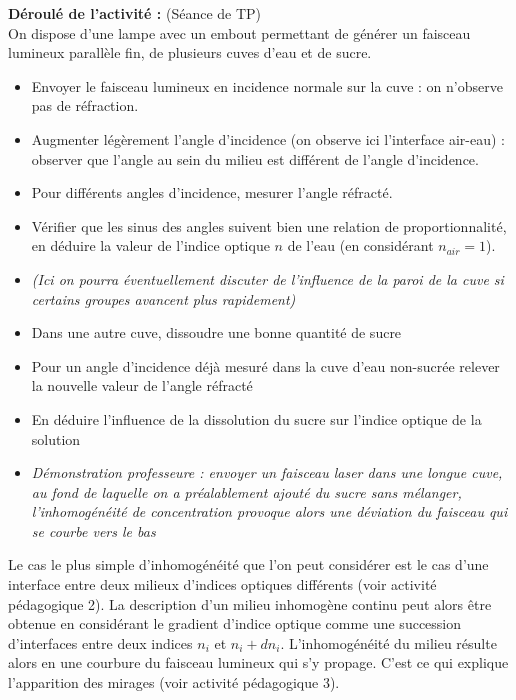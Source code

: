 \documentclass[a4paper,11pt]{article} %
\newcommand{\pointmedian}{{\fontfamily{cmr}\selectfont\textperiodcentered}}
\newenvironment{encart}[1]{%
	\begin{tcolorbox}
		[
		breakable, enhanced jigsaw, %
		arc = 1mm, %
		title = \textbf{#1}, %
		coltitle = white, %
		colbacktitle = blue, %
		colback = white, %
		colframe = blue %
		]
}{		
	\end{tcolorbox}
	\vspace*{0.35cm}
}
\begin{document}
\begin{encart}{Activité pédagogique 2 : Phénomène de réfraction -- Loi de Snell--Descartes}
		\textbf{Déroulé de l'activité :} (Séance de TP)\\
		On dispose d'une lampe avec un embout permettant de générer un faisceau lumineux parallèle fin, de plusieurs cuves d'eau et de sucre.
		\begin{itemize}
			\item Envoyer le faisceau lumineux en incidence normale sur la cuve : on n'observe pas de réfraction.
			\item Augmenter légèrement l'angle d'incidence (on observe ici l'interface air-eau) : observer que l'angle au sein du milieu est différent de l'angle d'incidence.
			\item Pour différents angles d'incidence, mesurer l'angle réfracté.
			\item Vérifier que les sinus des angles suivent bien une relation de proportionnalité, en déduire la valeur de l'indice optique $ n $ de l'eau (en considérant $ n_{air} = 1 $).
			\item \textit{(Ici on pourra éventuellement discuter de l'influence de la paroi de la cuve si certains groupes avancent plus rapidement)}
			\item Dans une autre cuve, dissoudre une bonne quantité de sucre
			\item Pour un angle d'incidence déjà mesuré dans la cuve d'eau non-sucrée relever la nouvelle valeur de l'angle réfracté
			\item En déduire l'influence de la dissolution du sucre sur l'indice optique de la solution
			\item \textit{Démonstration professeur\pointmedian e : envoyer un faisceau laser dans une longue cuve, au fond de laquelle on a préalablement ajouté du sucre sans mélanger, l'inhomogénéité de concentration provoque alors une déviation du faisceau qui se courbe vers le bas} 
		\end{itemize}
		
	\end{encart}
	

	Le cas le plus simple d'inhomogénéité que l'on peut considérer est le cas d'une interface entre deux milieux d'indices optiques différents (voir activité pédagogique 2). La description d'un milieu inhomogène continu peut alors être obtenue en considérant le gradient d'indice optique comme une succession d'interfaces entre deux indices $ n_i $ et $ n_i + dn_i $. L'inhomogénéité du milieu résulte alors en une courbure du faisceau lumineux qui s'y propage. C'est ce qui explique l'apparition des mirages (voir activité pédagogique 3).\\
	
\end{document}

